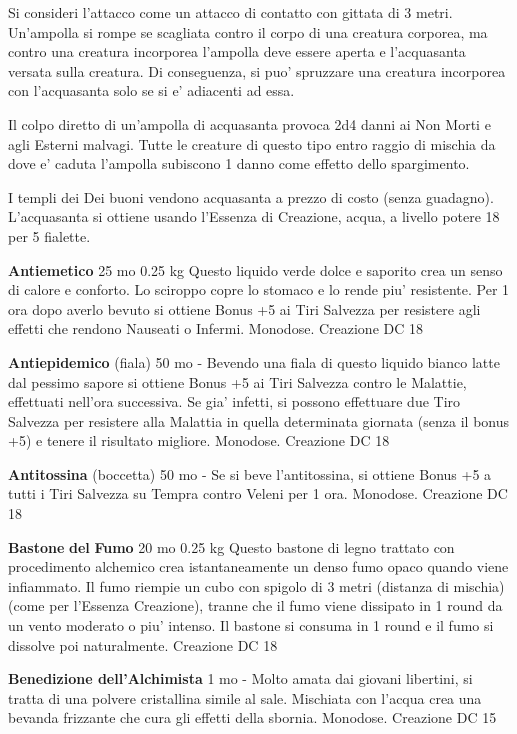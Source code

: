 \documentclass[a4paper,11pt,twoside,openany]{dndbook}
\begin{document}
{Si consideri l'attacco come un attacco di contatto con gittata di 3 metri. Un'ampolla si rompe se scagliata contro il corpo di una creatura corporea, ma contro una creatura incorporea l'ampolla deve essere aperta e l'acquasanta versata sulla creatura. Di conseguenza, si puo' spruzzare una creatura incorporea con l'acquasanta solo se si e' adiacenti ad essa.

Il colpo diretto di un'ampolla di acquasanta provoca 2d4 danni ai Non Morti e agli Esterni malvagi. Tutte le creature di questo tipo entro raggio di mischia da dove e' caduta l'ampolla subiscono 1 danno come effetto dello spargimento.

I templi dei Dei buoni vendono acquasanta a prezzo di costo (senza guadagno). L'acquasanta si ottiene usando l'Essenza di Creazione, acqua, a livello potere 18 per 5 fialette.

\textbf{Antiemetico} 25 mo 0.25 kg Questo liquido verde dolce e saporito crea un senso di calore e conforto. Lo sciroppo copre lo stomaco e lo rende piu' resistente. Per 1 ora dopo averlo bevuto si ottiene Bonus +5 ai Tiri Salvezza per resistere agli effetti che rendono Nauseati o Infermi. Monodose. Creazione DC 18

\textbf{Antiepidemico} (fiala) 50 mo - Bevendo una fiala di questo liquido bianco latte dal pessimo sapore si ottiene Bonus +5 ai Tiri Salvezza contro le Malattie, effettuati nell'ora successiva. Se gia' infetti, si possono effettuare due Tiro Salvezza per resistere alla Malattia in quella determinata giornata (senza il bonus +5) e tenere il risultato migliore. Monodose. Creazione DC 18

\textbf{Antitossina} (boccetta) 50 mo - Se si beve l'antitossina, si ottiene Bonus +5 a tutti i Tiri Salvezza su Tempra contro Veleni per 1 ora. Monodose. Creazione DC 18

\textbf{Bastone} \textbf{del} \textbf{Fumo} 20 mo 0.25 kg Questo bastone di legno trattato con procedimento alchemico crea istantaneamente un denso fumo opaco quando viene infiammato. Il fumo riempie un cubo con spigolo di 3 metri (distanza di mischia) (come per l'Essenza Creazione), tranne che il fumo viene dissipato in 1 round da un vento moderato o piu' intenso. Il bastone si consuma in 1 round e il fumo si dissolve
poi naturalmente. Creazione DC 18

\textbf{Benedizione dell'Alchimista} 1 mo - Molto amata dai giovani libertini, si tratta di una polvere cristallina simile al sale. Mischiata con l'acqua crea una bevanda frizzante che cura gli effetti della sbornia. Monodose. Creazione DC 15

}
\end{document}
